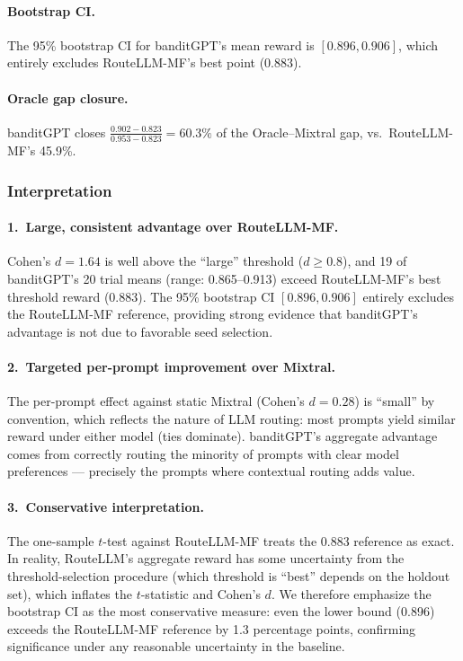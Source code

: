 \paragraph{Bootstrap CI.}
The 95\% bootstrap CI for banditGPT's mean reward is $[0.896, 0.906]$,
which entirely excludes RouteLLM-MF's best point ($0.883$).

\paragraph{Oracle gap closure.}
banditGPT closes $\frac{0.902 - 0.823}{0.953 - 0.823} = 60.3\%$ of the
Oracle--Mixtral gap, vs.\ RouteLLM-MF's 45.9\%.

\subsubsection{Interpretation}

\paragraph{1.\ Large, consistent advantage over RouteLLM-MF.}
Cohen's $d = 1.64$ is well above the ``large'' threshold ($d \geq 0.8$),
and 19 of banditGPT's 20 trial means (range: 0.865--0.913) exceed
RouteLLM-MF's best threshold reward (0.883).  The 95\% bootstrap CI
$[0.896, 0.906]$ entirely excludes the RouteLLM-MF reference, providing
strong evidence that banditGPT's advantage is not due to favorable
seed selection.

\paragraph{2.\ Targeted per-prompt improvement over Mixtral.}
The per-prompt effect against static Mixtral (Cohen's $d = 0.28$) is
``small'' by convention, which reflects the nature of LLM routing: most
prompts yield similar reward under either model (ties dominate).
banditGPT's aggregate advantage comes from correctly routing the minority
of prompts with clear model preferences --- precisely the prompts where
contextual routing adds value.

\paragraph{3.\ Conservative interpretation.}
The one-sample $t$-test against RouteLLM-MF treats the 0.883 reference as
exact.  In reality, RouteLLM's aggregate reward has some uncertainty from
the threshold-selection procedure (which threshold is ``best'' depends on
the holdout set), which inflates the $t$-statistic and Cohen's $d$.
We therefore emphasize the bootstrap CI as the most conservative measure:
even the lower bound (0.896) exceeds the RouteLLM-MF reference by 1.3
percentage points, confirming significance under any reasonable
uncertainty in the baseline.

